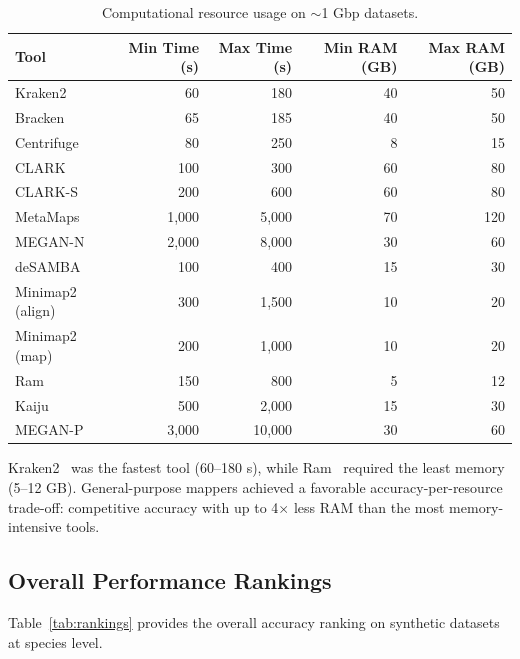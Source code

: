 \documentclass[11pt]{article}
\begin{document}
\begin{table}[ht]
\centering
\caption{Computational resource usage on $\sim$1 Gbp datasets.}
\label{tab:resources}
\begin{tabular}{@{}lrrrr@{}}
\toprule
Tool & Min Time (s) & Max Time (s) & Min RAM (GB) & Max RAM (GB) \\
\midrule
Kraken2 & 60 & 180 & 40 & 50 \\
Bracken & 65 & 185 & 40 & 50 \\
Centrifuge & 80 & 250 & 8 & 15 \\
CLARK & 100 & 300 & 60 & 80 \\
CLARK-S & 200 & 600 & 60 & 80 \\
MetaMaps & 1,000 & 5,000 & 70 & 120 \\
MEGAN-N & 2,000 & 8,000 & 30 & 60 \\
deSAMBA & 100 & 400 & 15 & 30 \\
Minimap2 (align) & 300 & 1,500 & 10 & 20 \\
Minimap2 (map) & 200 & 1,000 & 10 & 20 \\
Ram & 150 & 800 & 5 & 12 \\
Kaiju & 500 & 2,000 & 15 & 30 \\
MEGAN-P & 3,000 & 10,000 & 30 & 60 \\
\bottomrule
\end{tabular}
\end{table}

Kraken2~\citep{wood2019improved} was the fastest tool (60--180 s), while Ram~\citep{vaser2021ram} required the least memory (5--12 GB).  General-purpose mappers achieved a favorable accuracy-per-resource trade-off: competitive accuracy with up to 4$\times$ less RAM than the most memory-intensive tools.

\subsection{Overall Performance Rankings}

Table~\ref{tab:rankings} provides the overall accuracy ranking on synthetic datasets at species level.
\end{document}
